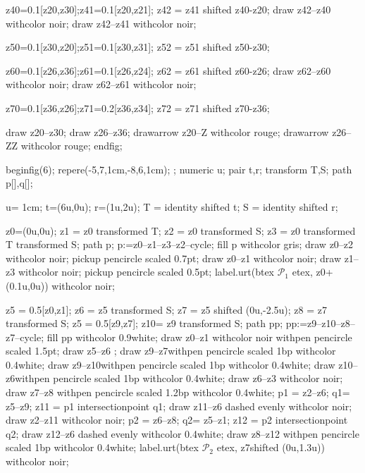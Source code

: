 \documentclass[12pt]{article}
\newcommand{\PR}{\mathscr{P}}
\begin{document}
z40=0.1[z20,z30];z41=0.1[z20,z21];
z42 = z41 shifted z40-z20;
draw z42--z40 withcolor noir;
draw z42--z41 withcolor noir;

z50=0.1[z30,z20];z51=0.1[z30,z31];
z52 = z51 shifted z50-z30;

z60=0.1[z26,z36];z61=0.1[z26,z24];
z62 = z61 shifted z60-z26;
draw z62--z60 withcolor noir;
draw z62--z61 withcolor noir;

z70=0.1[z36,z26];z71=0.2[z36,z34];
z72 = z71 shifted z70-z36;

draw z20--z30;
draw z26--z36;
drawarrow z20--Z  withcolor rouge;
drawarrow z26--ZZ withcolor rouge;
endfig;

beginfig(6);
repere(-5,7,1cm,-8,6,1cm); ;
 numeric u;
 pair t,r;
 transform T,S;
 path p[],q[];

 u= 1cm;
 t=(6u,0u); r=(1u,2u);
 T = identity shifted t;
 S = identity shifted r;

 z0=(0u,0u);
 z1 = z0 transformed T;
 z2 = z0 transformed S;
 z3 = z0 transformed T transformed S;
 path p;
 p:=z0--z1--z3--z2--cycle;
 fill p withcolor gris;
 draw z0--z2 withcolor noir;
 pickup pencircle scaled 0.7pt;
 draw z0--z1 withcolor noir;
 draw z1--z3 withcolor noir;
 pickup pencircle scaled 0.5pt;
 label.urt(btex $\PR_1$ etex, z0+(0.1u,0u)) withcolor noir;

 z5 = 0.5[z0,z1];
 z6 = z5 transformed S;
 z7 = z5 shifted (0u,-2.5u);
 z8 = z7 transformed S;
 z5 = 0.5[z9,z7];
 z10= z9 transformed S;
path pp;
pp:=z9--z10--z8--z7--cycle;
 fill pp withcolor 0.9white;
 draw z0--z1 withcolor noir withpen pencircle scaled 1.5pt;
 draw z5--z6 ; 
 draw z9--z7withpen pencircle scaled 1bp withcolor 0.4white;
 draw z9--z10withpen pencircle scaled 1bp withcolor 0.4white;
 draw z10--z6withpen pencircle scaled 1bp withcolor 0.4white;
 draw z6--z3 withcolor noir;
 draw z7--z8 withpen pencircle scaled 1.2bp withcolor 0.4white;
 p1 = z2--z6;
 q1= z5--z9;
 z11 = p1 intersectionpoint q1;
 draw z11--z6 dashed evenly withcolor noir;
 draw z2--z11 withcolor noir;
 p2 = z6--z8;
 q2= z5--z1;
 z12 = p2 intersectionpoint q2;
 draw z12--z6 dashed evenly  withcolor 0.4white;
 draw z8--z12 withpen pencircle scaled 1bp withcolor 0.4white;
label.urt(btex $\PR_2$ etex, z7shifted (0u,1.3u)) withcolor noir;
\end{document}
